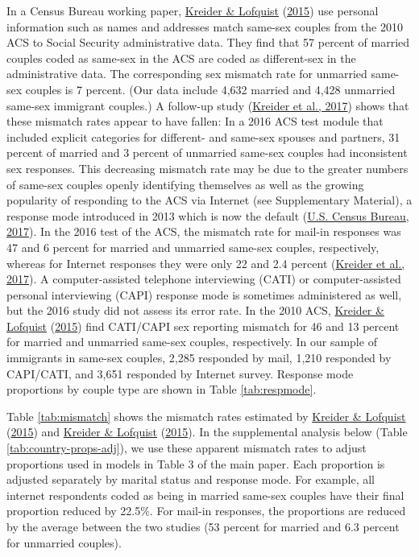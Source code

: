 \documentclass[
  11pt,
]{article}
\begin{document}
In a Census Bureau working paper, \protect\hyperlink{ref-kreider_2015}{Kreider \& Lofquist} (\protect\hyperlink{ref-kreider_2015}{2015}) use personal information such as names and addresses match same-sex couples from the 2010 ACS to Social Security administrative data. They find that 57 percent of married couples coded as same-sex in the ACS are coded as different-sex in the administrative data. The corresponding sex mismatch rate for unmarried same-sex couples is 7 percent. (Our data include 4,632 married and 4,428 unmarried same-sex immigrant couples.) A follow-up study (\protect\hyperlink{ref-kreider_2017}{Kreider et al., 2017}) shows that these mismatch rates appear to have fallen: In a 2016 ACS test module that included explicit categories for different- and same-sex spouses and partners, 31 percent of married and 3 percent of unmarried same-sex couples had inconsistent sex responses. This decreasing mismatch rate may be due to the greater numbers of same-sex couples openly identifying themselves as well as the growing popularity of responding to the ACS via Internet (see Supplementary Material), a response mode introduced in 2013 which is now the default (\protect\hyperlink{ref-u.s.censusbureau_2017}{U.S. Census Bureau, 2017}). In the 2016 test of the ACS, the mismatch rate for mail-in responses was 47 and 6 percent for married and unmarried same-sex couples, respectively, whereas for Internet responses they were only 22 and 2.4 percent (\protect\hyperlink{ref-kreider_2017}{Kreider et al., 2017}). A computer-assisted telephone interviewing (CATI) or computer-assisted personal interviewing (CAPI) response mode is sometimes administered as well, but the 2016 study did not assess its error rate. In the 2010 ACS, \protect\hyperlink{ref-kreider_2015}{Kreider \& Lofquist} (\protect\hyperlink{ref-kreider_2015}{2015}) find CATI/CAPI sex reporting mismatch for 46 and 13 percent for married and unmarried same-sex couples, respectively. In our sample of immigrants in same-sex couples, 2,285 responded by mail, 1,210 responded by CAPI/CATI, and 3,651 responded by Internet survey. Response mode proportions by couple type are shown in Table \ref{tab:respmode}.

Table \ref{tab:mismatch} shows the mismatch rates estimated by \protect\hyperlink{ref-kreider_2015}{Kreider \& Lofquist} (\protect\hyperlink{ref-kreider_2015}{2015}) and \protect\hyperlink{ref-kreider_2015}{Kreider \& Lofquist} (\protect\hyperlink{ref-kreider_2015}{2015}). In the supplemental analysis below (Table \ref{tab:country-props-adj}), we use these apparent mismatch rates to adjust proportions used in models in Table 3 of the main paper. Each proportion is adjusted separately by marital status and response mode. For example, all internet respondents coded as being in married same-sex couples have their final proportion reduced by 22.5\%. For mail-in responses, the proportions are reduced by the average between the two studies (53 percent for married and 6.3 percent for unmarried couples).
\end{document}
